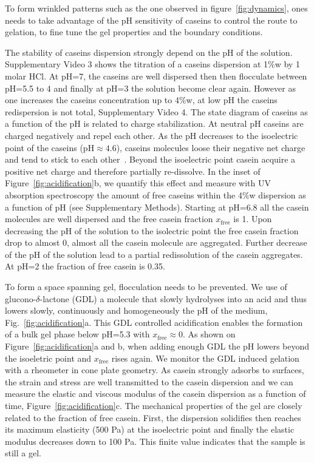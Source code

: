 \documentclass[twocolumn,superscriptaddress,showpacs,preprintnumbers,
amsmath,amssymb,prl]{revtex4-1}
\begin{document}
To form wrinkled patterns such as the one observed in figure~\ref{fig:dynamics}, ones needs to take advantage of the pH sensitivity of caseins to control the route to gelation, to fine tune the gel properties and the boundary conditions.

The stability of caseins dispersion strongly depend on the pH of the solution. Supplementary Video 3 shows the titration of a caseins dispersion at 1\%w by 1 molar HCl. At pH=7, the caseins are well dispersed then then flocculate between pH=5.5 to 4 and finally at pH=3 the solution become clear again. However as one increases the caseins concentration up to 4\%w, at low pH the caseins redispersion is not total, Supplementary Video 4. The state diagram of caseins as a function of the pH is related to charge stabilization. At neutral pH caseins are charged negatively and repel each other. As the pH decreases to the isoelectric point of the caseins (pH$\approx 4.6$), caseins molecules loose their negative net charge and tend to stick to each other~\cite{Roefs1986,Bremer1989,Lucey1998}. Beyond the isoelectric point casein acquire a positive net charge and therefore partially re-dissolve. In the inset of Figure~\ref{fig:acidification}b, we quantify this effect and measure with UV absorption spectroscopy the amount of free caseins within the 4\%w dispersion as a function of pH (see Supplementary Methods). Starting at pH=6.8 all the casein molecules are well dispersed and the free casein fraction $x_\text{free}$ is 1. Upon decreasing the pH of the solution to the isolectric point the free casein fraction drop to almost 0, almost all the casein molecule are aggregated. Further decrease of the pH of the solution lead to a partial redissolution of the casein aggregates. At pH=2 the fraction of free casein is 0.35.


To form a space spanning gel, flocculation needs to be prevented. We use of glucono-$\delta$-lactone (GDL) a molecule  that slowly hydrolyses into an acid and thus lowers slowly, continuously and homogeneously the pH of the medium, Fig.~\ref{fig:acidification}a. This GDL controlled acidification enables the formation of a bulk gel phase below pH=5.3 with $x_\text{free}\approx 0$. As shown on Figure~\ref{fig:acidification}a and b, when adding enough GDL the pH lowers beyond the isoeletric point and $x_\text{free}$ rises again. We monitor the GDL induced gelation with a rheometer in cone plate geometry. As casein strongly adsorbs to surfaces, the strain and stress are well transmitted to the casein dispersion and we can measure the elastic and viscous modulus of the casein dispersion as a function of time, Figure~\ref{fig:acidification}c. The mechanical properties of the gel are closely related to the fraction of free casein. First, the dispersion solidifies then reaches its maximum elasticity (500 Pa) at the isoelectric point and finally the elastic modulus decreases down to 100 Pa. This finite value indicates that the sample is still a gel.
\end{document}
